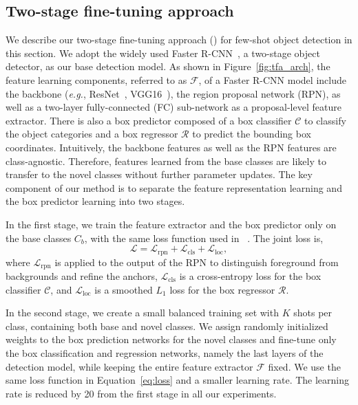 \subsection{Two-stage fine-tuning approach}
\label{sec:tfa}
We describe our two-stage fine-tuning approach (\model) for few-shot object detection in
this section. We adopt the widely used Faster R-CNN~\cite{ren2015faster}, a two-stage object
detector, as our base detection model. As shown in Figure~\ref{fig:tfa_arch}, the feature learning components, referred to as $\mathcal{F}$, of a Faster R-CNN model include the backbone (\textit{e.g.}, ResNet~\cite{he2016deep}, VGG16~\cite{simonyan2014very}), the region proposal network (RPN), as well as a two-layer
fully-connected (FC) sub-network as a proposal-level feature extractor. 
There is also a box predictor composed of a box classifier $\mathcal{C}$ to classify the
object categories and a box regressor $\mathcal{R}$ to predict the bounding box coordinates. 
Intuitively, the backbone features as well as the RPN features
are class-agnostic. Therefore, features learned from the base classes are likely to transfer
to the novel classes without further parameter updates. The key component of our method is to separate the
feature representation learning and the box predictor learning into two stages. 

 In the first stage, we train the feature extractor 
and the box predictor only on the base classes $C_b$, with the same loss function used in ~\citet{ren2015faster}. The joint loss is, 
\begin{equation}
    \mathcal{L} = \mathcal{L}_{\text{rpn}} + \mathcal{L}_{\text{cls}} + \mathcal{L}_{\text{loc}},
    \label{eq:loss}
\end{equation}
where $\mathcal{L}_\text{rpn}$ is applied
to the output of the RPN to distinguish foreground from backgrounds and refine the
anchors, $\mathcal{L}_\text{cls}$ is a cross-entropy loss for the box classifier $\mathcal{C}$,
and $\mathcal{L}_\text{loc}$ is a smoothed $L_1$ loss for the box regressor $\mathcal{R}$.

 In the second stage, we create a small balanced training set 
with $K$ shots per class, containing both base and novel classes.
We assign randomly initialized weights to the box prediction networks for the novel classes
and fine-tune only the box classification and
regression networks, namely the last layers of the detection model, while keeping the entire 
feature extractor $\mathcal{F}$ fixed. We use the same loss function
in Equation~\ref{eq:loss} and a smaller learning rate. The learning rate is reduced by 20 from the first stage in all our experiments. 

